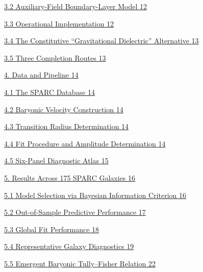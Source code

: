 \documentclass[11pt]{article}
\begin{document}
\hyperref[auxiliary-field-boundary-layer-model]{3.2 Auxiliary-Field Boundary-Layer Model \hyperref[auxiliary-field-boundary-layer-model]{12}}

\hyperref[operational-implementation]{3.3 Operational Implementation \hyperref[operational-implementation]{12}}

\hyperref[the-constitutive-gravitational-dielectric-alternative]{3.4 The Constitutive ``Gravitational Dielectric'' Alternative \hyperref[the-constitutive-gravitational-dielectric-alternative]{13}}

\hyperref[three-completion-routes]{3.5 Three Completion Routes \hyperref[three-completion-routes]{13}}

\hyperref[data-and-pipeline]{4. Data and Pipeline \hyperref[data-and-pipeline]{14}}

\hyperref[the-sparc-database]{4.1 The SPARC Database \hyperref[the-sparc-database]{14}}

\hyperref[baryonic-velocity-construction]{4.2 Baryonic Velocity Construction \hyperref[baryonic-velocity-construction]{14}}

\hyperref[transition-radius-determination]{4.3 Transition Radius Determination \hyperref[transition-radius-determination]{14}}

\hyperref[fit-procedure-and-amplitude-determination]{4.4 Fit Procedure and Amplitude Determination \hyperref[fit-procedure-and-amplitude-determination]{14}}

\hyperref[six-panel-diagnostic-atlas]{4.5 Six-Panel Diagnostic Atlas \hyperref[six-panel-diagnostic-atlas]{15}}

\hyperref[results-across-175-sparc-galaxies]{5. Results Across 175 SPARC Galaxies \hyperref[results-across-175-sparc-galaxies]{16}}

\hyperref[model-selection-via-bayesian-information-criterion]{5.1 Model Selection via Bayesian Information Criterion \hyperref[model-selection-via-bayesian-information-criterion]{16}}

\hyperref[out-of-sample-predictive-performance]{5.2 Out-of-Sample Predictive Performance \hyperref[out-of-sample-predictive-performance]{17}}

\hyperref[global-fit-performance]{5.3 Global Fit Performance \hyperref[global-fit-performance]{18}}

\hyperref[representative-galaxy-diagnostics]{5.4 Representative Galaxy Diagnostics \hyperref[representative-galaxy-diagnostics]{19}}

\hyperref[emergent-baryonic-tullyfisher-relation]{5.5 Emergent Baryonic Tully--Fisher Relation \hyperref[emergent-baryonic-tullyfisher-relation]{22}}
\end{document}
